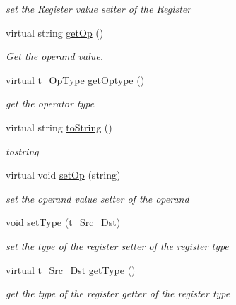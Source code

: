 \begin{DoxyCompactItemize}
\begin{DoxyCompactList}\small\item\em set the Register value setter of the Register \item\end{DoxyCompactList}\item 
virtual string \hyperlink{classOPRegister_a660f194996324eb71a3db0cbdccdab49}{getOp} ()
\begin{DoxyCompactList}\small\item\em Get the operand value. \item\end{DoxyCompactList}\item 
virtual t\_\-OpType \hyperlink{classOPRegister_a06690941f531390e7d71526244c0812b}{getOptype} ()
\begin{DoxyCompactList}\small\item\em get the operator type \item\end{DoxyCompactList}\item 
virtual string \hyperlink{classOPRegister_a233e4744403c78afc8e88e4c804a485f}{toString} ()
\begin{DoxyCompactList}\small\item\em tostring \item\end{DoxyCompactList}\item 
\hypertarget{classOPRegister_a7ef4a1673a14a98f6fbe30585781bdec}{
virtual void \hyperlink{classOPRegister_a7ef4a1673a14a98f6fbe30585781bdec}{setOp} (string)}
\label{classOPRegister_a7ef4a1673a14a98f6fbe30585781bdec}

\begin{DoxyCompactList}\small\item\em set the operand value setter of the operand \item\end{DoxyCompactList}\item 
\hypertarget{classOPRegister_aed2369f4a27d3033548a7be15ed34cfa}{
void \hyperlink{classOPRegister_aed2369f4a27d3033548a7be15ed34cfa}{setType} (t\_\-Src\_\-Dst)}
\label{classOPRegister_aed2369f4a27d3033548a7be15ed34cfa}

\begin{DoxyCompactList}\small\item\em set the type of the register setter of the register type \item\end{DoxyCompactList}\item 
\hypertarget{classOPRegister_a4b8d1403aab343f1fd599b5bfa437f76}{
virtual t\_\-Src\_\-Dst \hyperlink{classOPRegister_a4b8d1403aab343f1fd599b5bfa437f76}{getType} ()}
\label{classOPRegister_a4b8d1403aab343f1fd599b5bfa437f76}

\begin{DoxyCompactList}\small\item\em get the type of the register getter of the register type \item\end{DoxyCompactList}\end{DoxyCompactItemize}



